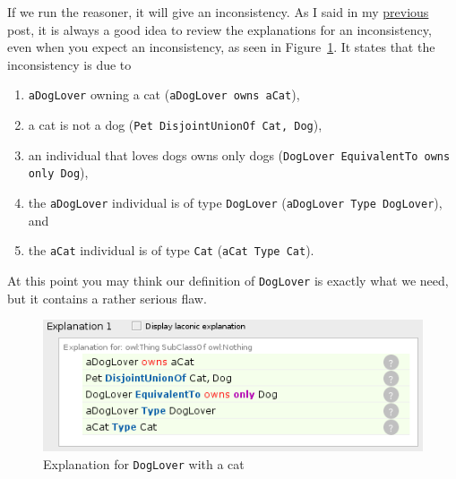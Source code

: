 \documentclass{amsart}
\begin{document}
If we run the reasoner, it will give an inconsistency. As I said in my \href{https://henrietteharmse.com/2018/04/26/understanding-owl-existential-property-restrictions/}{previous} post, it is always a good idea to review the explanations for an inconsistency, even when you expect an inconsistency, as seen in Figure~\ref{fig_ExplanationForDogLoverWithCat}. It states that the inconsistency is due to
\begin{enumerate}
 \item \texttt{aDogLover} owning a cat (\texttt{aDogLover owns aCat}),
 \item a cat is not a dog (\texttt{Pet DisjointUnionOf Cat, Dog}),
 \item an individual that loves dogs owns only dogs (\texttt{DogLover EquivalentTo owns only Dog}),
 \item the \texttt{aDogLover} individual is of type \texttt{DogLover} (\texttt{aDogLover Type DogLover}), and
 \item the \texttt{aCat} individual is of type \texttt{Cat} (\texttt{aCat Type Cat}).
\end{enumerate}

At this point you may think our definition of \texttt{DogLover} is exactly what we need, but it contains a rather serious flaw.

    \begin{figure}
      \centering \includegraphics[trim = 0mm 0mm 0mm 0mm, clip, scale=0.65]{./ExplanationForDogLoverWithCat.png}
      \caption{Explanation for \texttt{DogLover} with a cat}\label{fig_ExplanationForDogLoverWithCat}
    \end{figure}

  
\end{document}
